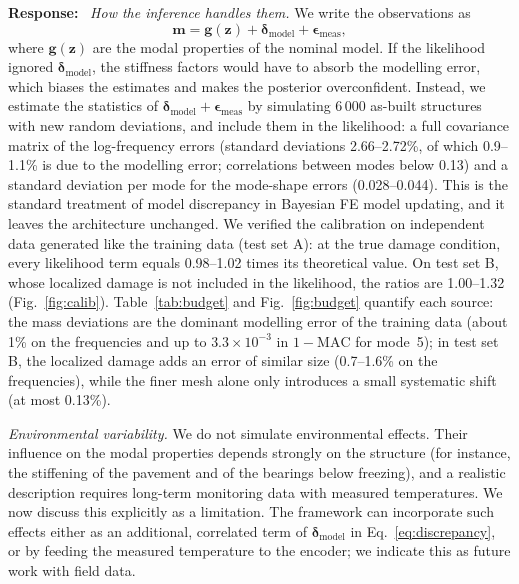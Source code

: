 \documentclass[11pt]{article}
\newenvironment{response}{\par\smallskip\noindent\color{resp}\textbf{Response:}\ }{\par}
\newcommand{\m}{\mathbf{m}}
\newcommand{\z}{\mathbf{z}}
\begin{document}
\begin{response}
\textit{How the inference handles them.} We write the observations as
\begin{equation}
\m=\mathbf{g}(\z)+\bm{\delta}_{\mathrm{model}}+\bm{\epsilon}_{\mathrm{meas}},
\label{eq:discrepancy}
\end{equation}
where $\mathbf{g}(\z)$ are the modal properties of the nominal model. If the likelihood ignored
$\bm{\delta}_{\mathrm{model}}$, the stiffness factors would have to absorb the modelling error, which biases the
estimates and makes the posterior overconfident. Instead, we estimate the statistics of
$\bm{\delta}_{\mathrm{model}}+\bm{\epsilon}_{\mathrm{meas}}$ by simulating 6\,000 as-built structures with new random
deviations, and include them in the likelihood: a full covariance matrix of the log-frequency errors (standard
deviations 2.66--2.72\%, of which 0.9--1.1\% is due to the modelling error; correlations between modes below 0.13) and
a standard deviation per mode for the mode-shape errors (0.028--0.044). This is the standard treatment of model
discrepancy in Bayesian FE model updating, and it leaves the architecture unchanged. We verified the calibration on
independent data generated like the training data (test set A): at the true damage condition, every likelihood term
equals 0.98--1.02 times its theoretical value. On test set B, whose localized damage is not included in the likelihood,
the ratios are 1.00--1.32 (Fig.~\ref{fig:calib}). Table~\ref{tab:budget} and Fig.~\ref{fig:budget} quantify each
source: the mass deviations are the dominant modelling error of the training data (about 1\% on the frequencies and up to
$3.3\times10^{-3}$ in $1-\mathrm{MAC}$ for mode~5); in test set B, the localized damage adds an error of similar size
(0.7--1.6\% on the frequencies), while the finer mesh alone only introduces a small systematic shift (at most 0.13\%).

\textit{Environmental variability.} We do not simulate environmental effects. Their influence on the modal properties
depends strongly on the structure (for instance, the stiffening of the pavement and of the bearings below freezing), and
a realistic description requires long-term monitoring data with measured temperatures. We now discuss this explicitly
as a limitation. The framework can incorporate such effects either as an additional, correlated term of
$\bm{\delta}_{\mathrm{model}}$ in Eq.~\eqref{eq:discrepancy}, or by feeding the measured temperature to the encoder; we
indicate this as future work with field data.
\end{response}
\end{document}
